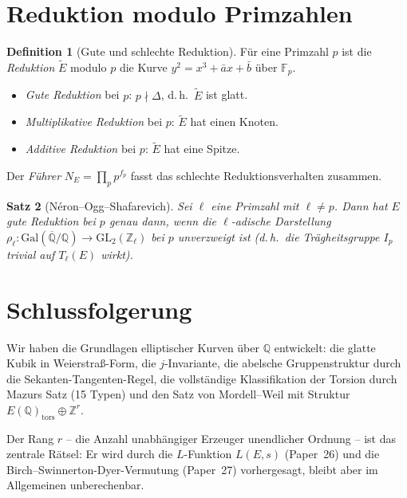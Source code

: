 \documentclass[12pt,a4paper]{amsart}
\newtheorem{theorem}{Satz}[section]
\theoremstyle{definition}
\newtheorem{definition}[theorem]{Definition}
\newcommand{\Z}{\mathbb{Z}}
\newcommand{\Q}{\mathbb{Q}}
\newcommand{\Fp}{\mathbb{F}_p}
\begin{document}
\section{Reduktion modulo Primzahlen}

\begin{definition}[Gute und schlechte Reduktion]
\label{def:reduction}
F\"ur eine Primzahl $p$ ist die \emph{Reduktion} $\tilde E$ modulo $p$
die Kurve $y^2 = x^3 + \bar a x + \bar b$ \"uber $\Fp$.
\begin{itemize}
  \item \emph{Gute Reduktion} bei $p$: $p \nmid \Delta$, d.\,h.\
    $\tilde E$ ist glatt.
  \item \emph{Multiplikative Reduktion} bei $p$: $\tilde E$ hat einen Knoten.
  \item \emph{Additive Reduktion} bei $p$: $\tilde E$ hat eine Spitze.
\end{itemize}
Der \emph{F\"uhrer} $N_E = \prod_p p^{f_p}$ fasst das schlechte
Reduktionsverhalten zusammen.
\end{definition}

\begin{theorem}[N\'eron--Ogg--Shafarevich]\label{thm:nos}
  Sei $\ell$ eine Primzahl mit $\ell \ne p$.  Dann hat $E$ gute
  Reduktion bei $p$ genau dann, wenn die $\ell$-adische Darstellung
  $\rho_\ell\colon \mathrm{Gal}(\overline{\Q}/\Q) \to \mathrm{GL}_2(\Z_\ell)$
  bei $p$ unverzweigt ist (d.\,h.\ die Tr\"agheitsgruppe $I_p$ trivial
  auf $T_\ell(E)$ wirkt).
\end{theorem}

\section{Schlussfolgerung}

Wir haben die Grundlagen elliptischer Kurven \"uber $\Q$ entwickelt:
die glatte Kubik in Weierstra\ss-Form, die $j$-Invariante,
die abelsche Gruppenstruktur durch die Sekanten-Tangenten-Regel,
die vollst\"andige Klassifikation der Torsion durch Mazurs Satz (15 Typen)
und den Satz von Mordell--Weil mit Struktur
$E(\Q)_{\mathrm{tors}} \oplus \Z^r$.

Der Rang $r$ -- die Anzahl unabh\"angiger Erzeuger unendlicher Ordnung --
ist das zentrale R\"atsel:
Er wird durch die $L$-Funktion $L(E,s)$ (Paper~26) und die
Birch--Swinnerton-Dyer-Vermutung (Paper~27) vorhergesagt,
bleibt aber im Allgemeinen unberechenbar.
\end{document}
